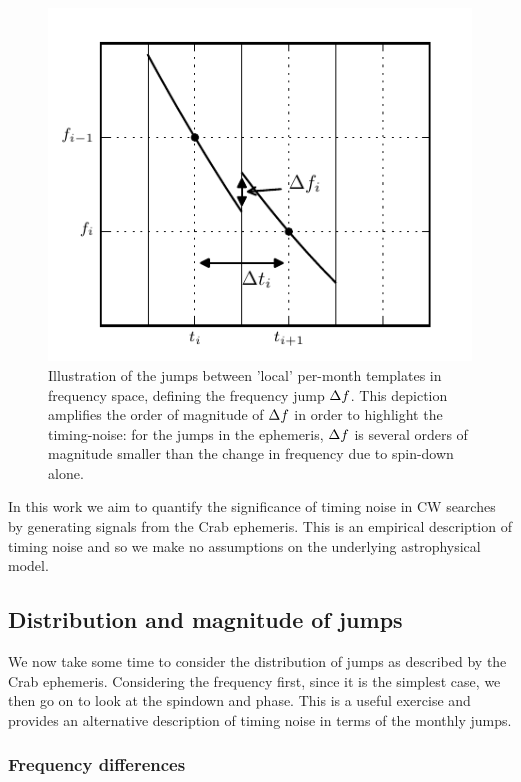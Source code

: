 \documentclass[../full_thesis/full_thesis.tex]{subfiles}
\begin{document}
\begin{figure}[htb]
\centering
    \includegraphics{template_jumps} 
\caption{Illustration of the jumps between 'local' per-month templates in 
    frequency space, defining the frequency jump $\Delta f$. This 
        depiction amplifies the order of magnitude of $\Delta f$ in order to
        highlight the timing-noise: for the jumps in the ephemeris, $\Delta f$
        is several orders of magnitude smaller than the change in frequency
        due to spin-down alone.}
\label{fig: template jumps}
\end{figure}

In this work we aim to quantify the significance of timing
noise in CW searches by generating signals from the Crab ephemeris. This
is an empirical description of timing noise and so we
make no assumptions on the underlying astrophysical model.

\subsection{Distribution and magnitude of jumps}\label{sec: jumps}
We now take some time to consider the distribution of jumps as described by the 
Crab ephemeris. Considering the frequency first, since it is the simplest
case, we then go on to look at the spindown and phase. This is a useful exercise and 
provides an alternative description of timing noise in terms of the monthly
jumps. 

\subsubsection{Frequency differences}
\end{document}
